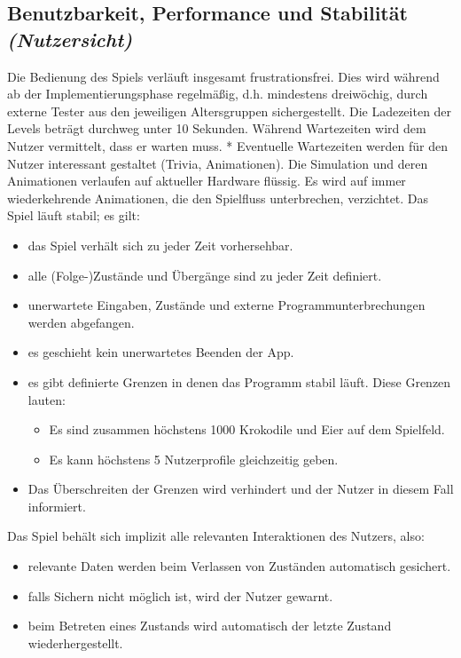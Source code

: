 \subsection{Benutzbarkeit, Performance und Stabilität \textit{(Nutzersicht)}}
\begin{requirements}
	 Die Bedienung des Spiels verläuft insgesamt frustrationsfrei. Dies wird während ab der Implementierungsphase regelmäßig, d.h. mindestens dreiwöchig, durch externe Tester aus den jeweiligen Altersgruppen sichergestellt.
	 Die Ladezeiten der Levels beträgt durchweg unter 10 Sekunden.
	 Während Wartezeiten wird dem Nutzer vermittelt, dass er warten muss.
	 Eventuelle Wartezeiten werden für den Nutzer interessant gestaltet (Trivia, Animationen).
	 Die Simulation und deren Animationen verlaufen auf aktueller Hardware flüssig.
	 Es wird auf immer wiederkehrende Animationen, die den Spielfluss unterbrechen, verzichtet.
	 Das Spiel läuft stabil; es gilt:
		\begin{itemize}
			\item das Spiel verhält sich zu jeder Zeit vorhersehbar.
			\item alle (Folge-)Zustände und Übergänge sind zu jeder Zeit definiert.
			\item unerwartete Eingaben, Zustände und externe Programmunterbrechungen werden abgefangen.
			\item es geschieht kein unerwartetes Beenden der App.
			\item es gibt definierte Grenzen in denen das Programm stabil läuft. Diese Grenzen lauten:
				\begin{itemize}
					\item Es sind zusammen höchstens 1000 Krokodile und Eier auf dem Spielfeld.
					\item Es kann höchstens 5 Nutzerprofile gleichzeitig geben.
				\end{itemize}
			\item Das Überschreiten der Grenzen wird verhindert und der Nutzer in diesem Fall informiert.
		\end{itemize}
	 Das Spiel behält sich implizit alle relevanten Interaktionen des Nutzers, also:
		\begin{itemize}
			\item relevante Daten werden beim Verlassen von Zuständen automatisch gesichert.
			\item falls Sichern nicht möglich ist, wird der Nutzer gewarnt.
			\item beim Betreten eines Zustands wird automatisch der letzte Zustand wiederhergestellt.
		\end{itemize}
\end{requirements}

